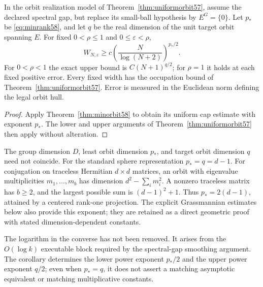 \begin{corollary}
\label{cor:allrepresentations58}
In the orbit realization model of Theorem~\ref{thm:uniformorbit57}, assume
the declared spectral gap, but replace its small-ball hypothesis by
$E^G=\{0\}$. Let $p_*$ be \eqref{eq:minrank58}, and let $q$ be the real
dimension of the unit target orbit spanning $E$. For fixed
$0<\rho\le1$ and $0\le\varepsilon<\rho$,
\[
 W_{N,\varepsilon}\ge c\left(\frac{N}{\log(N+2)}\right)^{p_*/2}.
\]
For $0<\rho<1$ the exact upper bound is $C(N+1)^{q/2}$; for $\rho=1$
it holds at each fixed positive error. Every fixed width has the
occupation bound of Theorem~\ref{thm:uniformorbit57}. Error is measured in
the Euclidean norm defining the legal orbit hull.
\end{corollary}
\begin{proof}
Apply Theorem~\ref{thm:minorbit58} to obtain its uniform cap estimate with
exponent $p_*$. The lower and upper arguments of
Theorem~\ref{thm:uniformorbit57} then apply without alteration.
\end{proof}
The group dimension $D$, least orbit dimension $p_*$, and target orbit
dimension $q$ need not coincide. For the standard sphere representation
$p_*=q=d-1$. For conjugation on traceless Hermitian $d\times d$ matrices,
an orbit with eigenvalue multiplicities $m_1,\ldots,m_b$ has dimension
$d^2-\sum_i m_i^2$. A nonzero traceless matrix has $b\ge2$, and the
largest possible sum is $(d-1)^2+1$. Thus $p_*=2(d-1)$, attained by a
centered rank-one projection. The explicit Grassmannian estimates below
also provide this exponent; they are retained as a direct geometric
proof with stated dimension-dependent constants.

The logarithm in the converse has not been removed. It arises from the
$O(\log k)$ executable block required by the spectral-gap smoothing
argument. The corollary determines the lower power exponent $p_*/2$ and
the upper power exponent $q/2$; even when $p_*=q$, it does not assert a
matching asymptotic equivalent or matching multiplicative constants.
